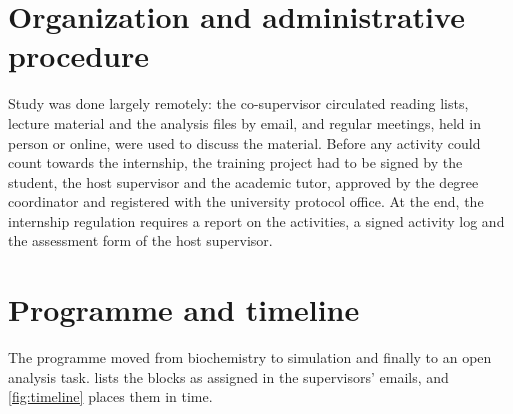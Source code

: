 \section{Organization and administrative procedure}
Study was done largely remotely: the co-supervisor circulated reading lists, lecture material and the analysis files by email, and regular meetings, held in person or online, were used to discuss the material. Before any activity could count towards the internship, the training project had to be signed by the student, the host supervisor and the academic tutor, approved by the degree coordinator and registered with the university protocol office. At the end, the internship regulation requires a report on the activities, a signed activity log and the assessment form of the host supervisor.

\section{Programme and timeline}
The programme moved from biochemistry to simulation and finally to an open analysis task.  lists the blocks as assigned in the supervisors' emails, and \cref{fig:timeline} places them in time.

